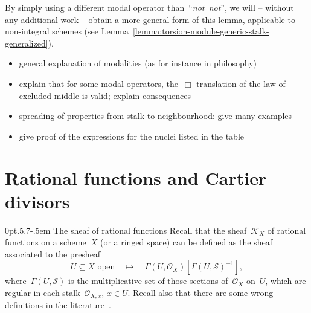 \documentclass[10pt,reqno,a4paper]{amsbook}
\makeatletter
\theoremstyle{definition}
\theoremstyle{plain}
\theoremstyle{remark}
\renewcommand{\O}{\mathcal{O}}
\newcommand{\K}{\mathcal{K}}
\renewcommand{\S}{\mathcal{S}}
\newcommand{\?}{\,{:}\,}
\renewcommand{\_}{\mathpunct{.}\,}
\newcommand{\notnot}{\emph{not~not}\xspace}
\def\subsection{\@startsection{subsection}{2}%
  {0pt}{.5\linespacing\@plus.7\linespacing}{-.5em}%
  {\normalfont\bfseries}}
\makeatother
\begin{document}
By simply using a different modal operator than~``\notnot'', we will -- without
any additional work -- obtain a more general form of this lemma, applicable to
non-integral schemes (see Lemma~\ref{lemma:torsion-module-generic-stalk-generalized}).

\begin{itemize}
\item general explanation of modalities (as for instance in philosophy)
\item explain that for some modal operators, the~$\Box$-translation of the law
of excluded middle is valid; explain consequences
\item spreading of properties from stalk to neighbourhood: give many examples
\item give proof of the expressions for the nuclei listed in the table
\end{itemize}


\section{Rational functions and Cartier divisors}
\label{sect:rational-functions}

\subsection{The sheaf of rational functions} Recall that the sheaf~$\K_X$ of rational
functions on a scheme~$X$ (or a ringed space) can be defined as the sheaf
associated to the presheaf
\[ \text{$U \subseteq X$ open} \quad\longmapsto\quad \Gamma(U,\O_X)[\Gamma(U,\S)^{-1}], \]
where~$\Gamma(U,\S)$ is the multiplicative set of those sections of~$\O_X$ on~$U$,
which are regular in each stalk~$\O_{X,x}$, $x \in U$. Recall also that there are
some wrong definitions in the literature~\cite{kleiman:misconceptions}.
\end{document}
